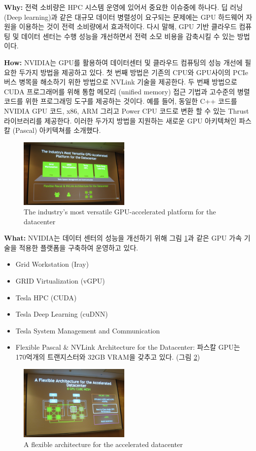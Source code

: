 \documentclass[twocolumn]{article}
\newcommand{\bi}{\begin{itemize}}
\newcommand{\ei}{\end{itemize}}
\newcommand{\ii}{\item}
\begin{document}
\noindent
\textbf{Why:}  전력 소비량은 HPC 시스템 운영에 있어서 중요한 이슈중에 하나다. 딥 러닝 (Deep learning)과 같은 대규모 데이터 병렬성이 요구되는 문제에는 GPU 하드웨어 자원을 이용하는 것이 전력 소비량에서 효과적이다. 다시 말해, GPU 기반 클라우드 컴퓨팅 및 데이터 센터는 수행 성능을 개선하면서 전력 소모 비용을 감축시킬 수 있는 방법이다.

\noindent
\textbf{How:}  NVIDIA는 GPU를 활용하여 데이터센터 및 클라우드 컴퓨팅의 성능 개선에 필요한 두가지 방법을 제공하고 있다.
첫 번째 방법은 기존의 CPU와 GPU사이의 PCIe 버스 병목을 해소하기 위한 방법으로 NVLink 기술을 제공한다.
두 번째 방법으로 CUDA 프로그래머를 위해 통합 메모리 (unified memory) 접근 기법과 고수준의 병렬 코드를 위한 프로그래밍 도구를 제공하는 것이다. 예를 들어,  동일한 C++ 코드를 NVIDIA GPU 코드, x86, ARM 그리고 Power CPU 코드로 변환 할 수 있는 Thrust 라이브러리를 제공한다.
이러한 두가지 방법을 지원하는 새로운 GPU 아키텍쳐인 파스칼 (Pascal) 아키텍쳐를 소개했다.

\begin{figure}[htb]
        \centering
        \includegraphics[width=0.48\textwidth]{gpu-platform.png}
        \caption{The industry's most versatile GPU-accelerated platform for the datacenter}
        \label{fig:gpu-accelerated-data-center}
\end{figure}

\noindent
\textbf{What:}  NVIDIA는 데이터 센터의 성능을 개선하기 위해 그림 \ref{fig:gpu-accelerated-data-center}과 같은 GPU 가속 기술을 적용한 플랫폼을 구축하여 운영하고 있다.
\bi
\ii Grid Workstation (Iray)
\ii GRID Virtualization (vGPU)
\ii Tesla HPC (CUDA)
\ii  Tesla Deep Learning (cuDNN)
\ii Tesla System Management and Communication
\ii  Flexible Pascal \& NVLink Architecture for the Datacenter: 파스칼 GPU는 170억개의 트랜지스터와 32GB VRAM을 갖추고 있다. (그림 \ref{fig:gpu-architecture})
\ei

\begin{figure}[htb]
        \centering
        \includegraphics[width=0.48\textwidth]{gpu-architecture.png}
        \caption{A flexible architecture for the accelerated datacenter}
        \label{fig:gpu-architecture}
\end{figure}
\end{document}

